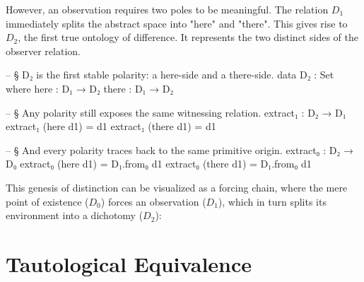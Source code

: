 \documentclass[11pt,a4paper]{book}
\begin{document}
However, an observation requires two poles to be meaningful. The relation $D_1$ immediately splits the abstract space into "here" and "there". This gives rise to $D_2$, the first true ontology of difference. It represents the two distinct sides of the observer relation.

\begin{code}
-- § D₂ is the first stable polarity: a here-side and a there-side.
data D₂ : Set where
  here  : D₁ → D₂
  there : D₁ → D₂

-- § Any polarity still exposes the same witnessing relation.
extract₁ : D₂ → D₁
extract₁ (here d1)  = d1
extract₁ (there d1) = d1

-- § And every polarity traces back to the same primitive origin.
extract₀ : D₂ → D₀
extract₀ (here d1)  = D₁.from₀ d1
extract₀ (there d1) = D₁.from₀ d1
\end{code}

This genesis of distinction can be visualized as a forcing chain, where the mere point of existence ($D_0$) forces an observation ($D_1$), which in turn splits its environment into a dichotomy ($D_2$):

\begin{center}
\end{center}

\section{Tautological Equivalence}
\end{document}
